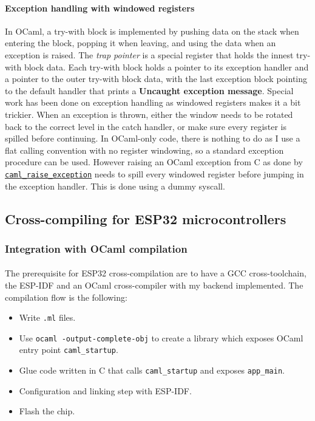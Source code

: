 \documentclass[a4paper]{article}
\begin{document}
\paragraph{Exception handling with windowed registers}
In OCaml, a try-with block is implemented by pushing data on the stack when entering the block, popping it when leaving, and using the data when an exception is raised. The \textit{trap pointer} is a special register that holds the innest try-with block data. Each try-with block holds a pointer to its exception handler and a pointer to the outer try-with block data, with the last exception block pointing to the default handler that prints a \textbf{Uncaught exception message}. 
Special work has been done on exception handling as windowed registers makes it a bit trickier. When an exception is thrown, either the window needs to be rotated back to the correct level in the catch handler, or make sure every register is spilled before continuing. 
In OCaml-only code, there is nothing to do as I use a flat calling convention with no register windowing, so a standard exception procedure can be used. However raising an OCaml exception from C as done by \href{https://github.com/well-typed-lightbulbs/ocaml-esp32/blob/4.06-esp32/asmrun/xtensa.S\#L332}{\texttt{caml\_raise\_exception}} needs to spill every windowed register before jumping in the exception handler. This is done using a dummy syscall.  

\subsection{Cross-compiling for ESP32 microcontrollers}
\subsubsection{Integration with OCaml compilation}
\paragraph{}
The prerequisite for ESP32 cross-compilation are to have a GCC cross-toolchain, the ESP-IDF and an OCaml cross-compiler with my backend implemented. The compilation flow is the following:
\begin{itemize}[itemsep=0pt,parsep=0pt]
	\item Write \texttt{.ml} files.
    \item Use \texttt{ocaml -output-complete-obj} to create a library which exposes OCaml entry point \texttt{caml\_startup}. 
    \item Glue code written in C that calls \texttt{caml\_startup} and exposes \texttt{app\_main}.
	\item Configuration and linking step with ESP-IDF.
	\item Flash the chip.
\end{itemize}
\end{document}
